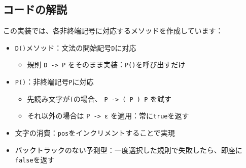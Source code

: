 \begin{Shaded}
\begin{Highlighting}[]
      \NormalTok{() \{}
        \CharTok{\textquotesingle{}(\textquotesingle{}}\NormalTok{) \{}
            \NormalTok{ (!}\NormalTok{()) } \NormalTok{;}
            \CharTok{\textquotesingle{})\textquotesingle{}}\NormalTok{) \{}
                 \NormalTok{();}
\NormalTok{            \} }\NormalTok{ \{}
                 \NormalTok{;}
\NormalTok{            \}}
\NormalTok{        \} }\NormalTok{ \{}
             \NormalTok{;}
\NormalTok{        \}}
\NormalTok{    \}}
\NormalTok{\}}
\end{Highlighting}
\end{Shaded}

\hypertarget{chapter5-ux30b3ux30fcux30c9ux306eux89e3ux8aac}{%
\subsection{コードの解説}\label{chapter5-ux30b3ux30fcux30c9ux306eux89e3ux8aac}}

この実装では、各非終端記号に対応するメソッドを作成しています：

\begin{itemize}
\item
  \texttt{D()}メソッド：文法の開始記号\texttt{D}に対応

  \begin{itemize}
  \tightlist
  \item
    規則 \texttt{D\ -\textgreater{}\ P}
    をそのまま実装：\texttt{P()}を呼び出すだけ
  \end{itemize}
\item
  \texttt{P()}：非終端記号\texttt{P}に対応

  \begin{itemize}
  \tightlist
  \item
    先読み文字が\texttt{(}の場合、 \texttt{P\ -\textgreater{}\ (\ P\ )\ P}
    を試す
  \item
    それ以外の場合は \texttt{P\ -\textgreater{}\ ε}
    を適用：常に\texttt{true}を返す
  \end{itemize}
\item
  文字の消費：\texttt{pos}をインクリメントすることで実現
\item
  バックトラックのない予測型：一度選択した規則で失敗したら、即座に\texttt{false}を返す
\end{itemize}

